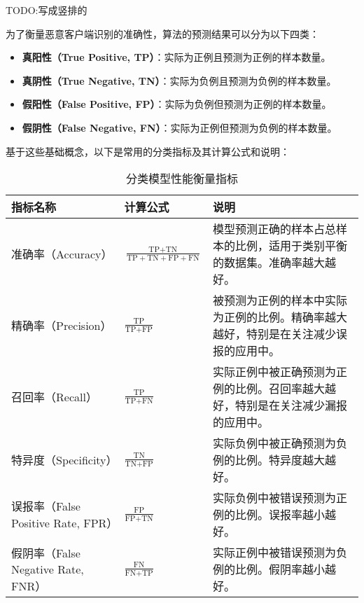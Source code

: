 \documentclass[lettersize,journal]{IEEEtran}
\begin{document}
TODO:写成竖排的

为了衡量恶意客户端识别的准确性，算法的预测结果可以分为以下四类：

\begin{itemize}
    \item \textbf{真阳性（True Positive, TP）}：实际为正例且预测为正例的样本数量。
    \item \textbf{真阴性（True Negative, TN）}：实际为负例且预测为负例的样本数量。
    \item \textbf{假阳性（False Positive, FP）}：实际为负例但预测为正例的样本数量。
    \item \textbf{假阴性（False Negative, FN）}：实际为正例但预测为负例的样本数量。
\end{itemize}

基于这些基础概念，以下是常用的分类指标及其计算公式和说明：

\begin{table}[h!]
\small
\centering
\begin{tabularx}{0.5\textwidth}{|X|X|X|}
\hline
\textbf{指标名称} & \textbf{计算公式} & \textbf{说明} \\ \hline
准确率（Accuracy） & 
$\frac{\text{TP} + \text{TN}}{\text{TP} + \text{TN} + \text{FP} + \text{FN}}$ & 
模型预测正确的样本占总样本的比例，适用于类别平衡的数据集。准确率越大越好。 \\ \hline

精确率（Precision） & 
$\frac{\text{TP}}{\text{TP} + \text{FP}}$ & 
被预测为正例的样本中实际为正例的比例。精确率越大越好，特别是在关注减少误报的应用中。 \\ \hline

召回率（Recall） & 
$\frac{\text{TP}}{\text{TP} + \text{FN}}$ & 
实际正例中被正确预测为正例的比例。召回率越大越好，特别是在关注减少漏报的应用中。 \\ \hline

特异度（Specificity） & 
$\frac{\text{TN}}{\text{TN} + \text{FP}}$ & 
实际负例中被正确预测为负例的比例。特异度越大越好。 \\ \hline

误报率（False Positive Rate, FPR） & 
$\frac{\text{FP}}{\text{FP} + \text{TN}}$ & 
实际负例中被错误预测为正例的比例。误报率越小越好。 \\ \hline

假阴率（False Negative Rate, FNR） & 
$\frac{\text{FN}}{\text{FN} + \text{TP}}$ & 
实际正例中被错误预测为负例的比例。假阴率越小越好。 \\ \hline

\end{tabularx}
\caption{分类模型性能衡量指标}
\end{table}
\end{document}
